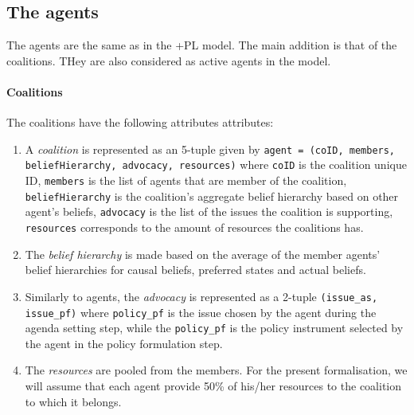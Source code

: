 \documentclass[11pt]{article}
\begin{document}

\subsection{The agents}

The agents are the same as in the +PL model. The main addition is that of the coalitions. THey are also considered as active agents in the model.

\paragraph{Coalitions}

The coalitions have the following attributes attributes:

\begin{enumerate}

\item A \emph{coalition} is represented as an 5-tuple given by \texttt{agent = (coID, members, beliefHierarchy, advocacy, resources)} where
\texttt{coID} is the coalition unique ID,
\texttt{members} is the list of agents that are member of the coalition, 
\texttt{beliefHierarchy} is the coalition's aggregate belief hierarchy based on other agent's beliefs, 
\texttt{advocacy} is the list of the issues the coalition is supporting,
\texttt{resources} corresponds to the amount of resources the coalitions has.

\item The \emph{belief hierarchy} is made based on the average of the member agents' belief hierarchies for causal beliefs, preferred states and actual beliefs.

\item Similarly to agents, the \emph{advocacy} is represented as a 2-tuple \texttt{(issue\_as, issue\_pf)} where \texttt{policy\_pf} is the issue chosen by the agent during the agenda setting step, while the \texttt{policy\_pf} is the policy instrument selected by the agent in the policy formulation step.

\item The \emph{resources} are pooled from the members. For the present formalisation, we will assume that each agent provide 50\% of his/her resources to the coalition to which it belongs. 

\end{enumerate}

\end{document}
